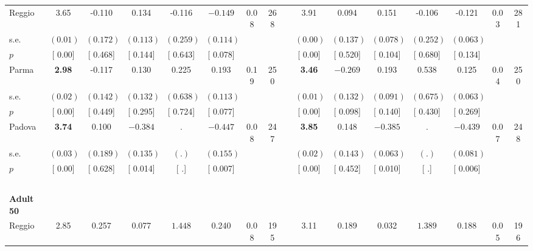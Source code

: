 \begin{longtable}{L{8em} c c c c c c c p{1em} c c c c c c c}
\quad \quad \quad Reggio& 3.65 &    -0.110 &     0.134 &    -0.116 & $ \mathbf{   -0.149}$ &      0.08 &       268 & & 3.91 &     0.094 &     0.151 &    -0.106 &    -0.121 &      0.03 &       281  \\*
\quad \quad \quad \quad s.e.& $ (     0.01)$ & $ (    0.172)$ & $ (    0.113)$ & $ (    0.259)$ & $ (    0.114)$ & & & & $ (     0.00)$ & $ (    0.137)$ & $ (    0.078)$ & $ (    0.252)$ & $ (    0.063)$ & &  \\*
\quad \quad \quad \quad $ p$ & [     0.00] & [    0.468] & [    0.144] & [    0.643] & [    0.078] & & & & [     0.00] & [    0.520] & [    0.104] & [    0.680] & [    0.134] & &  \\[1em]
\quad \quad \quad Parma& \textbf{     2.98} &    -0.117 &     0.130 &     0.225 & $ \mathbf{    0.193}$ &      0.19 &       250 & & \textbf{     3.46} & $ \mathbf{   -0.269}$ &     0.193 &     0.538 &     0.125 &      0.04 &       250  \\*
\quad \quad \quad \quad s.e.& $ (     0.02)$ & $ (    0.142)$ & $ (    0.132)$ & $ (    0.638)$ & $ (    0.113)$ & & & & $ (     0.01)$ & $ (    0.132)$ & $ (    0.091)$ & $ (    0.675)$ & $ (    0.063)$ & &  \\*
\quad \quad \quad \quad $ p$ & [     0.00] & [    0.449] & [    0.295] & [    0.724] & [    0.077] & & & & [     0.00] & [    0.098] & [    0.140] & [    0.430] & [    0.269] & &  \\[1em]
\quad \quad \quad Padova& \textbf{     3.74} &     0.100 & $ \mathbf{   -0.384}$ &         . & $ \mathbf{   -0.447}$ &      0.08 &       247 & & \textbf{     3.85} &     0.148 & $ \mathbf{   -0.385}$ &         . & $ \mathbf{   -0.439}$ &      0.07 &       248  \\*
\quad \quad \quad \quad s.e.& $ (     0.03)$ & $ (    0.189)$ & $ (    0.135)$ & $ (        .)$ & $ (    0.155)$ & & & & $ (     0.02)$ & $ (    0.143)$ & $ (    0.063)$ & $ (        .)$ & $ (    0.081)$ & &  \\*
\quad \quad \quad \quad $ p$ & [     0.00] & [    0.628] & [    0.014] & [        .] & [    0.007] & & & & [     0.00] & [    0.452] & [    0.010] & [        .] & [    0.006] & &  \\[1em]
~\\[1em]
\quad \quad \textbf{Adult 50} & & & & & & & & & & & & & & & \\* 
\quad \quad \quad Reggio& 2.85 &     0.257 &     0.077 & $ \mathbf{    1.448}$ &     0.240 &      0.08 &       195 & & 3.11 &     0.189 &     0.032 & $ \mathbf{    1.389}$ &     0.188 &      0.05 &       196  \\*

\end{longtable}
